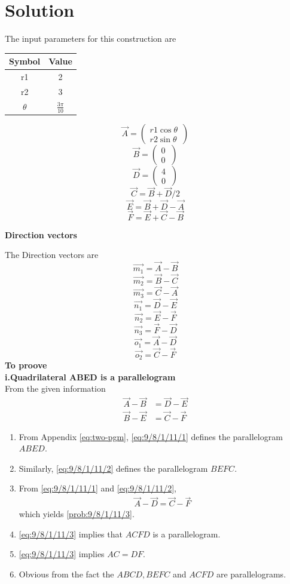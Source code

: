 \documentclass[10pt, a4paper]{article}
\begin{document}
\section{Solution}
\begin{center}
The input parameters for this construction are
\begin{tabular}{|c|c|}
	\hline
	\textbf{Symbol}&\textbf{Value}\\
	\hline
	r1&2\\
	\hline
	r2&3\\
	\hline
	$\theta$&$\frac{{3}\pi}{10}$\\
	\hline
\end{tabular}
\boldmath
$$\vec{A}=\begin{pmatrix} r1\cos\theta\\ r2\sin\theta\ \end{pmatrix}$$
$$\vec{B}=\begin{pmatrix} 0\\ 0\ \end{pmatrix}$$
$$\vec{D}=\begin{pmatrix} 4\\ 0\ \end{pmatrix}$$
$$\vec{C}={\vec{B}+\vec{D}}/2$$
$$\vec{E}={\vec{B}+\vec{D}-\vec{A}}$$
$$\vec{F}={\vec{E}+\vec{C}-\vec{B}}$$
\unboldmath
\end{center}
\textbf{Direction vectors}

The Direction vectors are
\boldmath
$$\vec{m_1}={\vec{A}-\vec{B}} $$
$$\vec{m_2}={\vec{B}-\vec{C}} $$
$$\vec{m_3}={\vec{C}-\vec{A}} $$
$$\vec{n_1}={\vec{D}-\vec{E}} $$
$$\vec{n_2}={\vec{E}-\vec{F}} $$
$$\vec{n_3}={\vec{F}-\vec{D}} $$
$$\vec{o_1}={\vec{A}-\vec{D}} $$
$$\vec{o_2}={\vec{C}-\vec{F}} $$
\unboldmath
\textbf{To proove\\ i.Quadrilateral ABED is a parallelogram}\\
\fi
\solution 
From the given information
\begin{align}
		\label{eq:9/8/1/11/1}
	\vec{A}-\vec{B}&= \vec{D}-\vec{E}
	\\
	\vec{B}-\vec{E}&= \vec{C}-\vec{F}
		\label{eq:9/8/1/11/2}
\end{align}
\begin{enumerate}
	\item From Appendix 
	  \ref{eq:two-pgm}, 
		\eqref{eq:9/8/1/11/1} defines the parallelogram $ABED$.
	\item Similarly, 
		\eqref{eq:9/8/1/11/2} defines the parallelogram $BEFC$.
	\item From 
		\eqref{eq:9/8/1/11/1}
		and 
		\eqref{eq:9/8/1/11/2},
\begin{align}
	\vec{A}-\vec{D}=
 \vec{C}-\vec{F}
		\label{eq:9/8/1/11/3}
\end{align}
which  yields
		\ref{prob:9/8/1/11/3}.
	\item 
		\eqref{eq:9/8/1/11/3} implies that $ACFD$ is a parallelogram.
	\item \eqref{eq:9/8/1/11/3} implies $AC = DF$.
	\item Obvious from the fact the $ABCD, BEFC$ and $ACFD$ are parallelograms.
\end{enumerate}
\iffalse
\end{document}
